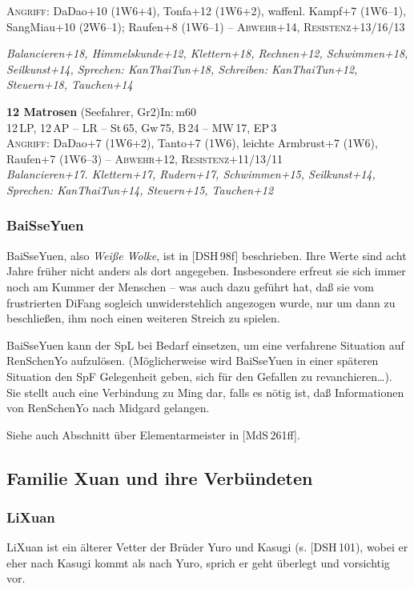 \documentclass[
a4paper,
twoside,
DIV=calc,
BCOR=4mm,
fontsize=9pt,
twocolumn=on,
titlepage=on,
parskip=half
]{scrartcl}
\begin{document}
\textsc{Angriff:} DaDao+10 (1W6+4), Tonfa+12 (1W6+2),
waffenl. Kampf+7 (1W6--1), SangMiau+10 (2W6--1); Raufen+8 (1W6--1) -- 
\textsc{Abwehr}+14, \textsc{Resistenz}+13/16/13

\emph{Balancieren+18, Himmelskunde+12, Klettern+18, Rechnen+12,
  Schwimmen+18, Seilkunst+14, Sprechen: KanThaiTun+18, Schreiben:
  KanThaiTun+12, Steuern+18, Tauchen+14}

\textbf{12 Matrosen} (Seefahrer, Gr2)\hfill In:\,m60\\
12\,LP, 12\,AP -- LR -- St\,65, Gw\,75, B\,24 -- MW\,17, EP\,3\\
\textsc{Angriff:} DaDao+7 (1W6+2), Tanto+7 (1W6), leichte Armbrust+7
(1W6), Raufen+7 (1W6--3) -- \textsc{Abwehr}+12,
\textsc{Resistenz}+11/13/11\\
\emph{Balancieren+17. Klettern+17, Rudern+17, Schwimmen+15,
Seilkunst+14, Sprechen: KanThaiTun+14, Steuern+15, Tauchen+12}

\subsubsection{BaiSseYuen}

BaiSseYuen, also \emph{Weiße Wolke}, ist in [DSH\,98f]
beschrieben. Ihre Werte sind acht Jahre früher nicht anders als dort
angegeben. Insbesondere erfreut sie sich immer noch am Kummer der
Menschen -- was auch dazu geführt hat, daß sie vom frustrierten DiFang
sogleich unwiderstehlich angezogen wurde, nur um dann zu beschließen,
ihm noch einen weiteren Streich zu spielen.

BaiSseYuen kann der SpL bei Bedarf einsetzen, um eine verfahrene
Situation auf RenSchenYo aufzulösen. (Möglicherweise wird BaiSseYuen
in einer späteren Situation den SpF Gelegenheit geben, sich für den
Gefallen zu revanchieren\dots). Sie stellt auch eine Verbindung zu
Ming dar, falls es nötig ist, daß Informationen von RenSchenYo nach
Midgard gelangen.

Siehe auch Abschnitt über Elementarmeister in [MdS\,261ff].

\subsection{Familie Xuan und ihre Verbündeten}

\subsubsection{LiXuan}

LiXuan ist ein älterer Vetter der Brüder Yuro und Kasugi
(s. [DSH\,101), wobei er eher nach Kasugi kommt als nach Yuro, sprich
er geht überlegt und vorsichtig vor.
\end{document}
